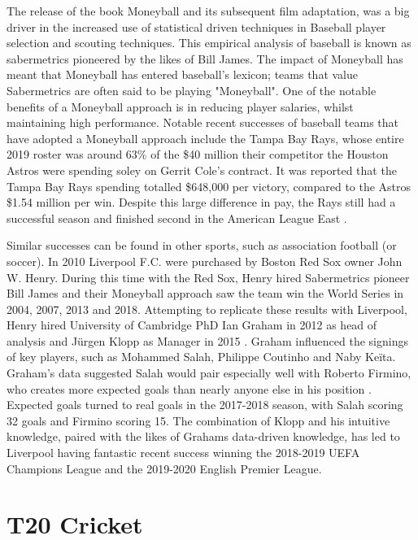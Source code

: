 \documentclass[12pt,a4paper]{report}
\theoremstyle{definition}
\begin{document}
The release of the book Moneyball \citep{Moneyball2004} and its subsequent film adaptation, was a big driver in the increased use of statistical driven techniques in Baseball player selection and scouting techniques. 
This empirical analysis of baseball is known as sabermetrics pioneered by the likes of Bill James.
The impact of Moneyball has meant that Moneyball has entered baseball's lexicon; teams that value Sabermetrics are often said to be playing "Moneyball".  
One of the notable benefits of a Moneyball approach is in reducing player salaries, whilst maintaining high performance. 
Notable recent successes of baseball teams that have adopted a Moneyball approach include the Tampa Bay Rays, whose entire 2019 roster was around 63\% of the \$40 million their competitor the Houston Astros were spending soley on Gerrit Cole's contract. 
It was reported that the Tampa Bay Rays spending totalled \$648,000 per victory, compared to the Astros \$1.54 million per win.
Despite this large difference in pay, the Rays still had a successful season and finished second in the American League East \citep{Fox2019}.

Similar successes can be found in other sports, such as association football (or soccer). 
In 2010 Liverpool F.C. were purchased by Boston Red Sox owner John W. Henry. 
During this time with the Red Sox, Henry hired Sabermetrics pioneer Bill James and their Moneyball approach saw the team win the World Series in 2004, 2007, 2013 and 2018. 
Attempting to replicate these results with Liverpool, Henry hired University of Cambridge PhD Ian Graham in 2012 as head of analysis and J\"urgen Klopp as Manager in 2015 \citep{Liverpool2022}. 
Graham influenced the signings of key players, such as Mohammed Salah, Philippe Coutinho and Naby Ke\"ita. 
Graham's data suggested Salah would pair especially well with Roberto Firmino, who creates more expected goals than nearly anyone else in his position \citep{Liverpool2019}. 
Expected goals turned to real goals in the 2017-2018 season, with Salah scoring 32 goals and Firmino scoring 15. 
The combination of Klopp and his intuitive knowledge, paired with the likes of Grahams data-driven knowledge, has led to Liverpool having fantastic recent success winning the 2018-2019 UEFA Champions League and the 2019-2020 English Premier League.

\section{T20 Cricket} \label{sec:T20Cricket}
\end{document}
